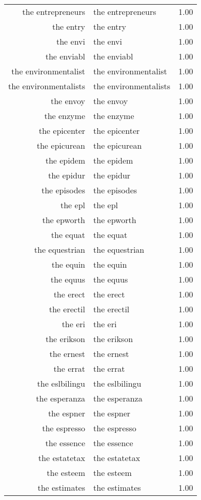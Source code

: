 \begin{table}[ht]
\begin{tabular}{rlr}
  the entrepreneurs & the entrepreneurs & 1.00 \\ 
  the entry & the entry & 1.00 \\ 
  the envi & the envi & 1.00 \\ 
  the enviabl & the enviabl & 1.00 \\ 
  the environmentalist & the environmentalist & 1.00 \\ 
  the environmentalists & the environmentalists & 1.00 \\ 
  the envoy & the envoy & 1.00 \\ 
  the enzyme & the enzyme & 1.00 \\ 
  the epicenter & the epicenter & 1.00 \\ 
  the epicurean & the epicurean & 1.00 \\ 
  the epidem & the epidem & 1.00 \\ 
  the epidur & the epidur & 1.00 \\ 
  the episodes & the episodes & 1.00 \\ 
  the epl & the epl & 1.00 \\ 
  the epworth & the epworth & 1.00 \\ 
  the equat & the equat & 1.00 \\ 
  the equestrian & the equestrian & 1.00 \\ 
  the equin & the equin & 1.00 \\ 
  the equus & the equus & 1.00 \\ 
  the erect & the erect & 1.00 \\ 
  the erectil & the erectil & 1.00 \\ 
  the eri & the eri & 1.00 \\ 
  the erikson & the erikson & 1.00 \\ 
  the ernest & the ernest & 1.00 \\ 
  the errat & the errat & 1.00 \\ 
  the eslbilingu & the eslbilingu & 1.00 \\ 
  the esperanza & the esperanza & 1.00 \\ 
  the espner & the espner & 1.00 \\ 
  the espresso & the espresso & 1.00 \\ 
  the essence & the essence & 1.00 \\ 
  the estatetax & the estatetax & 1.00 \\ 
  the esteem & the esteem & 1.00 \\ 
  the estimates & the estimates & 1.00 \\ 

\end{tabular}
\end{table}
